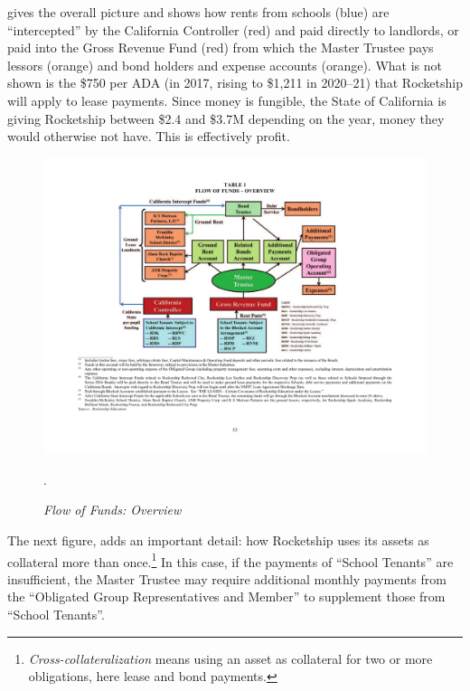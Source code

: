  gives the overall picture and shows how rents from schools (blue) are ``intercepted'' by the California Controller (red) and paid directly to landlords, or paid into the Gross Revenue Fund (red) from which the Master Trustee pays lessors (orange) and bond holders and expense accounts (orange). What is not shown is the \$750 per ADA (in 2017, rising to \$1,211 in 2020–21) that Rocketship will apply to lease payments. Since money is fungible, the State of California is giving Rocketship between \$2.4 and \$3.7M depending on the year, money they would otherwise not have. This is effectively profit.

\begin{figure}[hbt]
  \centering
  \caption[Flow of Funds: Overview]{\textit{Flow of Funds: Overview}}\label{fig:flow_of_funds_overview}
  \includegraphics[width=\textwidth]{Flow_of_Funds_Overview}\\
  \footnotesize\raggedright\textcite[53]{CSFA2017}. 
\end{figure}

The next figure,  adds an important detail: how Rocketship uses its assets as collateral more than once.\footnote{\textit{Cross-collateralization} means using an asset as collateral for two or more obligations, here lease and bond payments.} In this case, if the payments of ``School Tenants'' are insufficient, the Master Trustee may require additional monthly payments from the ``Obligated Group Representatives and Member'' to supplement those from ``School Tenants''. 

